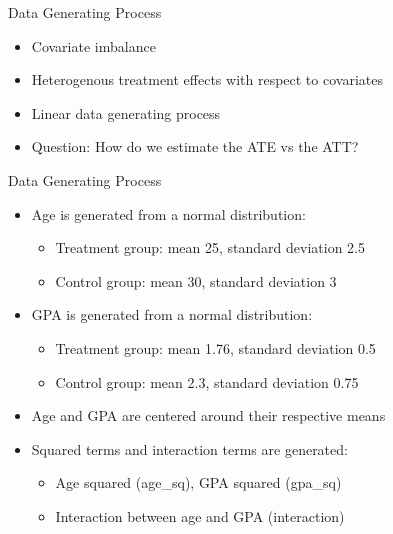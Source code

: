 \documentclass{beamer}
\begin{document}
\begin{frame}{Data Generating Process}

\begin{itemize}
\item Covariate imbalance
\item Heterogenous treatment effects with respect to covariates
\item Linear data generating process
\item Question: How do we estimate the ATE vs the ATT?
\end{itemize}

\end{frame}

\begin{frame}{Data Generating Process}
\begin{itemize}
\item Age is generated from a normal distribution:
\begin{itemize}
\item Treatment group: mean 25, standard deviation 2.5
\item Control group: mean 30, standard deviation 3
\end{itemize}
\item GPA is generated from a normal distribution:
\begin{itemize}
\item Treatment group: mean 1.76, standard deviation 0.5
\item Control group: mean 2.3, standard deviation 0.75
\end{itemize}
\item Age and GPA are centered around their respective means
\item Squared terms and interaction terms are generated:
\begin{itemize}
\item Age squared (age_sq), GPA squared (gpa_sq)
\item Interaction between age and GPA (interaction)
\end{itemize}
\end{itemize}
\end{frame}
\end{document}
